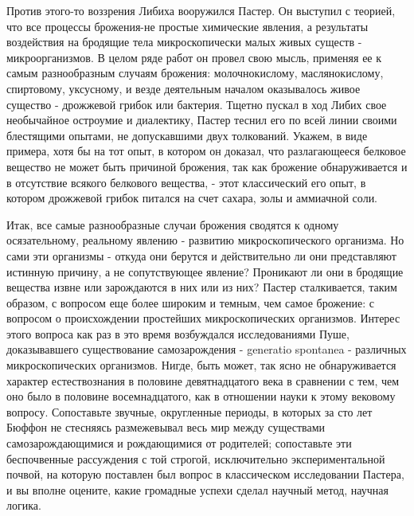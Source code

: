 Против этого-то  воззрения  Либиха  вооружился  Пастер.  Он  выступил  с
теорией, что  все процессы  брожения-не  простые химические  явления,  а
результаты воздействия  на  бродящие тела  микроскопически  малых  живых
существ -  микроорганизмов. В  целом ряде  работ он  провел свою  мысль,
применяя ее  к  самым разнообразным  случаям  брожения:  молочнокислому,
маслянокислому,  спиртовому,  уксусному,  и  везде  деятельным   началом
оказывалось живое  существо  -  дрожжевой грибок  или  бактерия.  Тщетно
пускал в  ход  Либих свое  необычайное  остроумие и  диалектику,  Пастер
теснил его по всей линии своими блестящими опытами, не допускавшими двух
толкований. Укажем, в виде  примера, хотя бы на  тот опыт, в котором  он
доказал, что  разлагающееся белковое  вещество  не может  быть  причиной
брожения,  так  как  брожение  обнаруживается  и  в  отсутствие  всякого
белкового вещества, -  этот классический его  опыт, в котором  дрожжевой
грибок питался на счет сахара, золы и аммиачной соли.

Итак,  все  самые  разнообразные  случаи  брожения  сводятся  к   одному
осязательному, реальному явлению - развитию микроскопического организма.
Но сами  эти организмы  -  откуда они  берутся  и действительно  ли  они
представляют истинную причину, а не сопутствующее явление? Проникают  ли
они в бродящие вещества извне или  зарождаются в них или из них?  Пастер
сталкивается, таким образом, с вопросом еще более широким и темным,  чем
самое брожение: с вопросом  о происхождении простейших  микроскопических
организмов. Интерес  этого  вопроса  как раз  в  это  время  возбуждался
исследованиями  Пуше,  доказывавшего   существование  самозарождения   -
generatio spontanea - различных микроскопических организмов. Нигде, быть
может, так  ясно не  обнаруживается характер  естествознания в  половине
девятнадцатого  века  в  сравнении  с  тем,  чем  оно  было  в  половине
восемнадцатого,  как  в  отношении  науки  к  этому  вековому   вопросу.
Сопоставьте звучные, округленные периоды, в которых за сто лет Бюффон не
стесняясь размежевывал весь  мир между  существами самозарождающимися  и
рождающимися от родителей;  сопоставьте эти  беспочвенные рассуждения  с
той  строгой,   исключительно  экспериментальной   почвой,  на   которую
поставлен был вопрос  в классическом исследовании  Пастера, и вы  вполне
оцените, какие громадные успехи сделал научный метод, научная логика.

